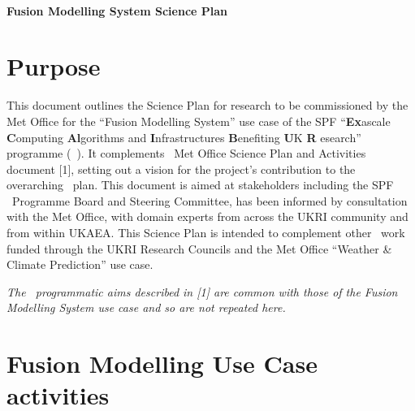 {\Huge{}{ \textbf{\exc \  }}}

{\Huge{}{ \textbf{Fusion Modelling System Science Plan} }}

\section*{Purpose}

This document outlines the Science Plan for research to be commissioned 
by the Met Office for the ``Fusion Modelling System'' use case of the SPF ``\textbf{Ex}ascale 
\textbf{C}omputing \textbf{Al}gorithms 
and \textbf{I}nfrastructures \textbf{B}enefiting 
\textbf{U}K \textbf{R} esearch'' 
programme (\exc \  ). It complements \exc \   Met Office Science Plan and Activities 
document [1], setting out a vision for the project's contribution to the overarching 
\exc \   plan. This document is aimed at stakeholders including the SPF \exc \   
Programme Board and Steering Committee, has been informed by consultation with 
the Met Office, with domain experts from across the UKRI community and from within 
UKAEA. This Science Plan is intended to complement other \exc \   work funded 
through the UKRI Research Councils and the Met Office ``Weather \& Climate Prediction'' 
use case.

\textit{The \exc \   programmatic aims described in [1] are common 
with those of the Fusion Modelling System use case and so are not repeated here.}

\section*{Fusion Modelling Use Case activities}

